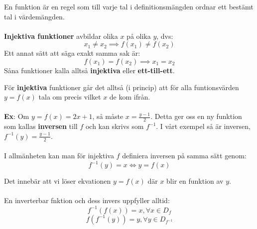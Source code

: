 \documentclass{report}
\begin{document}
{
En funktion är en regel som till varje tal i definitionsmängden ordnar ett bestämt tal i värdemängden.\\\\

\textbf{Injektiva funktioner} avbildar olika $ x $ på olika $ y $, dvs:
\begin{equation*}
x_1 \ne x_2 \implies f(x_1) \ne f(x_2)
\end{equation*}
Ett annat sätt att säga exakt samma sak är:
\begin{equation*}
f(x_1) = f(x_2) \implies x_1 = x_2
\end{equation*}
Såna funktioner kalla alltså \textbf{injektiva} eller \textbf{ett-till-ett}. 
}

{
}

\vspace{20pt}
{
För \textbf{injektiva}  funktioner går det alltså (i princip) att för alla funtionsvärden $ y = f(x) $ tala om precis vilket $ x $ de kom ifrån.\\\\

\textbf{Ex}: Om $ y=f(x) = 2x+1 $, så måste $ x = \frac{y-1}{2} $. Detta ger oss en ny funktion som kallas \textbf{inversen} till $ f $ och kan skrivs som $ f^{-1} $. I vårt exempel så är inversen, $ f^{-1}(y) = \frac{y-1}{2}  $.\\\\

I allmänheten kan man för injektiva $ f $ definiera inversen på samma sätt genom:
\begin{equation*}
	f^{-1}(y) = x \iff y = f(x)
\end{equation*}

Det innebär att vi löser ekvationen $ y=f(x) $ där $ x $ blir en funktion av $ y $.\\\\


En inverterbar fnktion och dess invers uppfyller alltid:
\begin{equation*}
	f^{-1}(f(x)) = x, \forall x \in D_f
\end{equation*}
\begin{equation*}
	f(f^{-1}(y)) = y, \forall y \in D_{f^{-1}}
\end{equation*}
}

\end{document}
